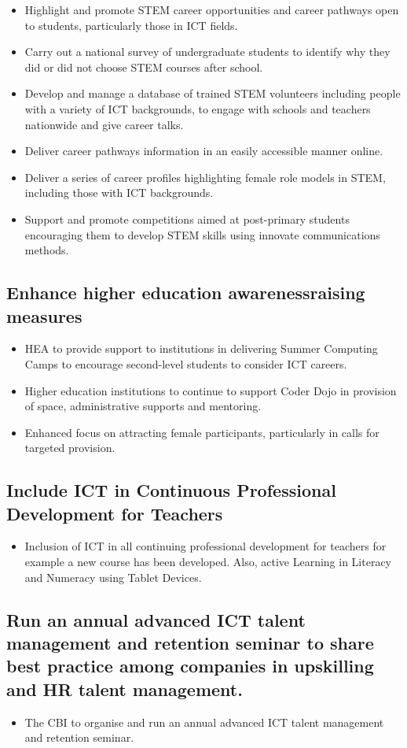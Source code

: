 \begin{itemize}
    \item Highlight and promote STEM career opportunities and career pathways open to students, particularly those in ICT fields.
    \item Carry out a national survey of undergraduate students to identify why they did or did not choose STEM courses after school.
    \item Develop and manage a database of trained STEM volunteers including people with a variety of ICT backgrounds, to engage with schools and teachers nationwide and give career talks.
    \item Deliver career pathways information in an easily accessible manner online.
    \item Deliver a series of career profiles highlighting female role models in STEM, including those with ICT backgrounds.
    \item Support and promote competitions aimed at post-primary students encouraging them to develop STEM skills using innovate communications methods.
\end{itemize}

\subsection{Enhance higher education awarenessraising measures}

\begin{itemize}
    \item HEA to provide support to institutions in delivering Summer Computing Camps to encourage second-level students to consider ICT careers.
    \item Higher education institutions to continue to support Coder Dojo in provision of space, administrative supports and mentoring.
    \item Enhanced focus on attracting female participants, particularly in calls for targeted provision.
\end{itemize}

\subsection{Include ICT in Continuous Professional Development for Teachers}

\begin{itemize}
    \item Inclusion of ICT in all continuing professional development for teachers for example a new course has been developed. Also, active Learning in Literacy and Numeracy using Tablet Devices.
\end{itemize}

\subsection{Run an annual advanced ICT talent management and retention seminar to share best practice among companies in upskilling and HR talent management.}

\begin{itemize}
    \item The CBI to organise and run an annual advanced ICT talent management and retention seminar.
\end{itemize}